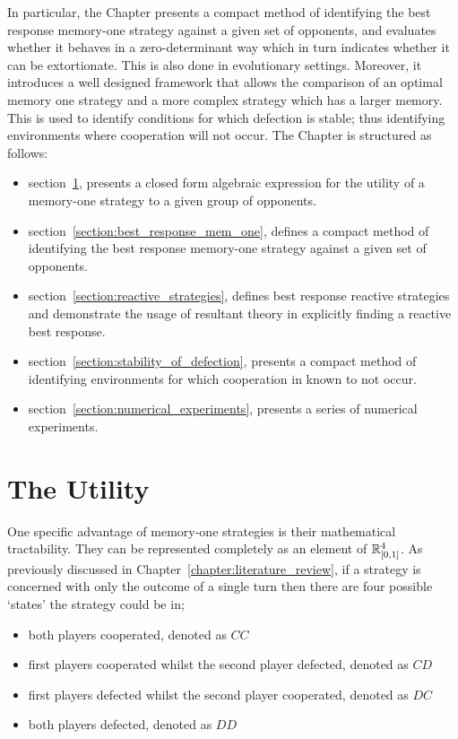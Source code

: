 In particular, the Chapter presents a compact method of identifying the best
response memory-one strategy against a given set of opponents, and evaluates
whether it behaves in a zero-determinant way which in turn indicates whether it
can be extortionate. This is also done in evolutionary settings. Moreover, it
introduces a well designed framework that allows the comparison of an optimal
memory one strategy and a more complex strategy which has a larger memory. This
is used to identify conditions for which defection is stable; thus identifying
environments where cooperation will not occur. The Chapter is structured as
follows:

\begin{itemize}
    \item section~\ref{section:utility}, presents a closed form algebraic expression for
    the utility of a memory-one strategy to a given group of opponents.
    \item section~\ref{section:best_response_mem_one}, defines a compact method
    of identifying the best response memory-one strategy against a given set
    of opponents.
    \item section~\ref{section:reactive_strategies}, defines best response reactive
    strategies and demonstrate the usage of resultant theory in explicitly finding
    a reactive best response.
    \item section~\ref{section:stability_of_defection}, presents a compact method of identifying environments
    for which cooperation in known to not occur.
    \item section~\ref{section:numerical_experiments}, presents a series of numerical experiments.
\end{itemize}


\section{The Utility}\label{section:utility}

One specific advantage of memory-one strategies is their mathematical
tractability. They can be represented completely as an element of \(\mathbb{R}^{4}_{[0, 1]}\).
As previously discussed in Chapter~\ref{chapter:literature_review}, 
if a strategy is concerned with only the outcome of a single turn then there are
four possible `states' the strategy could be in;

\begin{itemize}
    \item both players cooperated, denoted as \(CC\)
    \item first players cooperated whilst the second player defected, denoted as \(CD\)
    \item first players defected whilst the second player cooperated, denoted as \(DC\)
    \item both players defected, denoted as \(DD\)
\end{itemize}

